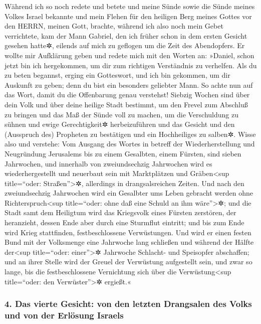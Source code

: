 Während ich so noch redete und betete und meine Sünde
sowie die Sünde meines Volkes Israel bekannte und mein Flehen für den
heiligen Berg meines Gottes vor den HERRN, meinen Gott, brachte,
während ich also noch mein Gebet verrichtete, kam der
Mann Gabriel, den ich früher schon in dem ersten Gesicht gesehen hatte✲,
eilends auf mich zu geflogen um die Zeit des Abendopfers.
Er wollte mir Aufklärung geben und redete mich mit den
Worten an: »Daniel, schon jetzt bin ich hergekommen, um dir zum
richtigen Verständnis zu verhelfen. Als du zu beten
begannst, erging ein Gotteswort, und ich bin gekommen, um dir Auskunft
zu geben; denn du bist ein besonders geliebter Mann. So achte nun auf
das Wort, damit du die Offenbarung genau verstehst!
Siebzig Wochen sind über dein Volk und über deine heilige
Stadt bestimmt, um den Frevel zum Abschluß zu bringen und das Maß der
Sünde voll zu machen, um die Verschuldung zu sühnen und ewige
Gerechtigkeit✲ herbeizuführen und das Gesicht und den (Ausspruch des)
Propheten zu bestätigen und ein Hochheiliges zu salben✲.
Wisse also und verstehe: Vom Ausgang des Wortes in
betreff der Wiederherstellung und Neugründung Jerusalems bis zu einem
Gesalbten, einem Fürsten, sind sieben Jahrwochen, und innerhalb von
zweiundsechzig Jahrwochen wird es wiederhergestellt und neuerbaut sein
mit Marktplätzen und Gräben\textless sup title=``oder:
Straßen''\textgreater✲, allerdings in drangsalsreichen Zeiten.
Und nach den zweiundsechzig Jahrwochen wird ein Gesalbter
ums Leben gebracht werden ohne Richterspruch\textless sup title=``oder:
ohne daß eine Schuld an ihm wäre''\textgreater✲; und die Stadt samt dem
Heiligtum wird das Kriegsvolk eines Fürsten zerstören, der heranzieht,
dessen Ende aber durch eine Sturmflut eintritt; und bis zum Ende wird
Krieg stattfinden, festbeschlossene Verwüstungen. Und
wird er einen festen Bund mit der Volksmenge eine Jahrwoche lang
schließen und während der Hälfte der\textless sup title=``oder:
einer''\textgreater✲ Jahrwoche Schlacht- und Speisopfer abschaffen; und
an ihrer Stelle wird der Greuel der Verwüstung aufgestellt sein, und
zwar so lange, bis die festbeschlossene Vernichtung sich über die
Verwüstung\textless sup title=``oder: den Verwüster''\textgreater✲
ergießt.«

\hypertarget{das-vierte-gesicht-von-den-letzten-drangsalen-des-volks-und-von-der-erluxf6sung-israels}{%
\subsubsection{4. Das vierte Gesicht: von den letzten Drangsalen des
Volks und von der Erlösung
Israels}\label{das-vierte-gesicht-von-den-letzten-drangsalen-des-volks-und-von-der-erluxf6sung-israels}}

